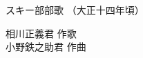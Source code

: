\documentclass[10pt,b5j]{tarticle} %
\begin{document}
\begin{minipage}[c]{0.7\hsize} %
    \begin{center}
        {\LARGE
            スキー部部歌 %
        }
        {\small 
            （大正十四年頃） %
        }
    \end{center}
\end{minipage}
\begin{minipage}[c]{0.3\hsize} %
    \begin{flushright} %
        相川正義君 作歌\\小野鉄之助君 作曲 %
    \end{flushright}
\end{minipage}
\end{document}
